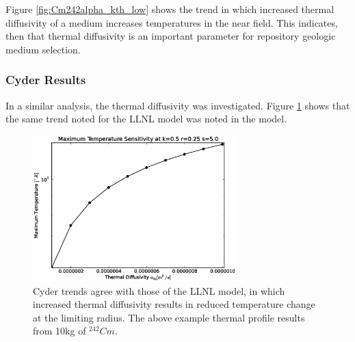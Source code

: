 Figure \ref{fig:Cm242alpha_kth_low} shows the trend in which increased thermal 
diffusivity of a medium increases temperatures in the near field. This 
indicates, then that thermal diffusivity is an important parameter for 
repository geologic medium selection.

%


\FloatBarrier

\subsubsection{Cyder Results}

In a similar analysis, the thermal diffusivity was investigated. Figure 
\ref{fig:diffusivity_cyder} shows that the same trend noted for the LLNL model was noted in the 
\Cyder model.

\begin{figure}[htbp!]
    \begin{center}
      \includegraphics[width=0.7\textwidth]{./chapters/demonstration/diffusivity/diffusivity_cyder.eps}
      \caption[$\alpha_{th}$ Sensitivity in Cyder]{Cyder trends agree with those 
        of the LLNL model, in which increased thermal diffusivity results in 
        reduced temperature change at the limiting radius. The above example 
        thermal profile results from 10kg of $^{242}Cm$.} 
        \label{fig:diffusivity_cyder}
      \end{center}
    \end{figure}


